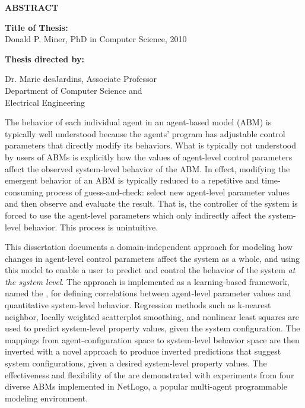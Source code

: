 \newpage
\pagestyle{empty}

\begin{center}
\vspace{0.1in}
\large{\bf ABSTRACT} \par  
\bigskip \bigskip
\end{center}

\begin{flushleft}
{\bf Title of Thesis:} \thesistitle\\
Donald P. Miner, PhD in Computer Science, 2010 \\
\begin{singlespace}
{\bf Thesis directed by:}{\hspace{2.5mm}} \parbox[t]{3in}{Dr. Marie desJardins, Associate Professor\\
Department of Computer Science and \\ Electrical Engineering}
\end{singlespace}
\end{flushleft}

\begin{singlespace}

The behavior of each individual agent in an agent-based model (ABM) is typically well understood because the agents' program has adjustable control parameters that directly modify its behaviors.
What is typically not understood by users of ABMs is explicitly how the values of agent-level control parameters affect the observed
system-level behavior of the ABM.
In effect, modifying the emergent behavior of an ABM is typically reduced to a repetitive and time-consuming process of guess-and-check: select new agent-level parameter values and then observe and evaluate the result.
That is, the controller of the system is forced to use the agent-level parameters which only indirectly affect the system-level behavior.
This process is unintuitive.

This dissertation documents a domain-independent approach for modeling how changes in agent-level control parameters affect the system as a whole, and using this model to enable a user to predict and control the behavior of the system \textit{at the system level}.
The approach is implemented as a learning-based framework, named the \framework,  for defining correlations between agent-level parameter values and quantitative system-level behavior.
Regression methods such as k-nearest neighbor, locally weighted scatterplot smoothing, and nonlinear least squares are used to predict system-level property values, given the system configuration.
The mappings from agent-configuration space to system-level behavior space are then inverted with a novel approach to produce inverted predictions that suggest system configurations, given a desired system-level property values.
The effectiveness and flexibility of the \framework are demonstrated with experiments from four diverse ABMs implemented in NetLogo, a popular multi-agent programmable modeling environment.

\end{singlespace}

\par\vfil

